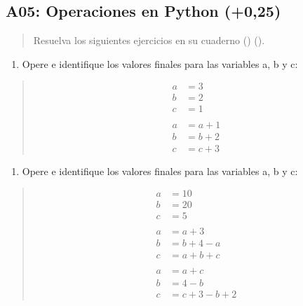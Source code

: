 \documentclass[letterpaper,10pt,spanish]{sphinxmanual}
\begin{document}
\subsection{A05: Operaciones en Python (+0,25)}
\label{\detokenize{1_guias/10programacion/G1025:a05-operaciones-en-python-0-25}}
\sphinxAtStartPar
{}
\begin{quote}

\sphinxAtStartPar
Resuelva los siguientes ejercicios en su cuaderno () ().
\end{quote}
\begin{enumerate}
%
\item {} 
\sphinxAtStartPar
Opere e identifique los valores finales para las variables a, b y c:

\end{enumerate}
\begin{quote}
\begin{equation*}
\begin{split}a &= 3
\\ b &= 2
\\ c &= 1
\\
\\ a &= a + 1
\\ b &= b + 2
\\ c &= c + 3\end{split}
\end{equation*}\end{quote}
\begin{enumerate}
%
\setcounter{enumi}{1}
\item {} 
\sphinxAtStartPar
Opere e identifique los valores finales para las variables a, b y c:

\end{enumerate}
\begin{quote}
\begin{equation*}
\begin{split}a &= 10
\\ b &= 20
\\ c &= 5
\\
\\ a &= a + 3
\\ b &= b + 4 - a
\\ c &= a + b + c
\\
\\ a &= a + c
\\ b &= 4 - b
\\ c &= c + 3 - b + 2\end{split}
\end{equation*}\end{quote}
\end{document}
